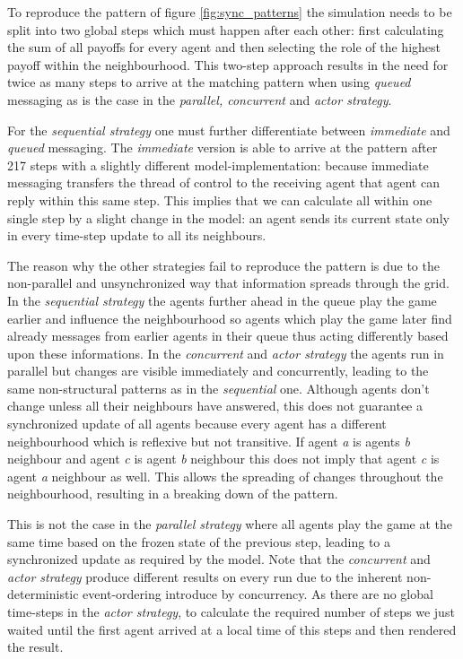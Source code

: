 To reproduce the pattern of figure \ref{fig:sync_patterns} the simulation needs to be split into two global steps which must happen after each other: first calculating the sum of all payoffs for every agent and then selecting the role of the highest payoff within the neighbourhood. This two-step approach results in the need for twice as many steps to arrive at the matching pattern when using \textit{queued} messaging as is the case in the \textit{parallel, concurrent} and \textit{actor strategy}.

For the \textit{sequential strategy} one must further differentiate between \textit{immediate} and \textit{queued} messaging. The \textit{immediate} version is able to arrive at the pattern after 217 steps with a slightly different model-implementation: because immediate messaging transfers the thread of control to the receiving agent that agent can reply within this same step. This implies that we can calculate all within one single step by a slight change in the model: an agent sends its current state only in every time-step update to all its neighbours.  

The reason why the other strategies fail to reproduce the pattern is due to the non-parallel and unsynchronized way that information spreads through the grid. In the \textit{sequential strategy} the agents further ahead in the queue play the game earlier and influence the neighbourhood so agents which play the game later find already messages from earlier agents in their queue thus acting differently based upon these informations. In the \textit{concurrent} and \textit{actor strategy} the agents run in parallel but changes are visible immediately and concurrently, leading to the same non-structural patterns as in the \textit{sequential} one. Although agents don't change unless all their neighbours have answered, this does not guarantee a synchronized update of all agents because every agent has a different neighbourhood which is reflexive but not transitive. If agent \textit{a} is agents \textit{b} neighbour and agent \textit{c} is agent \textit{b} neighbour this does not imply that agent \textit{c} is agent \textit{a} neighbour as well. This allows the spreading of changes throughout the neighbourhood, resulting in a breaking down of the pattern.

This is not the case in the \textit{parallel strategy}  where all agents play the game at the same time based on the frozen state of the previous step, leading to a synchronized update as required by the model. Note that the \textit{concurrent} and \textit{actor strategy} produce different results on every run due to the inherent non-deterministic event-ordering introduce by concurrency. As there are no global time-steps in the \textit{actor strategy}, to calculate the required number of steps we just waited until the first agent arrived at a local time of this steps and then rendered the result.


